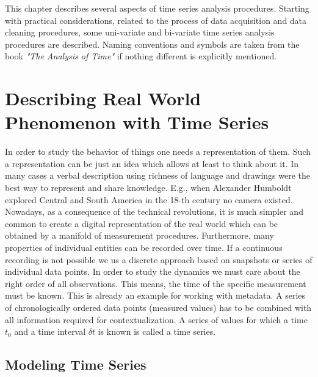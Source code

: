 \documentclass[a4paper,10pt]{scrbook}
\begin{document}
This chapter describes several aspects of time series analysis procedures. Starting with practical considerations, related to the process of data acquisition and data cleaning procedures, some uni-variate and bi-variate time series analysis procedures are described. Naming conventions and symbols are taken from the book \textit{"The Analysis of Time"} \cite{Chatfiled2004} if nothing different is explicitly mentioned.



\section{Describing Real World Phenomenon with Time Series}
In order to study the behavior of things one needs a representation of them. Such a representation can be just an idea which allows at least to think about it. In many cases a verbal description using richness of language and drawings were the best way to represent and share knowledge. E.g., when Alexander Humboldt explored Central and South America in the 18-th century no camera existed. Nowadays, as a consequence of the technical revolutions, it is much simpler and common to create a digital representation of the real world which can be obtained by a manifold of measurement procedures. Furthermore, many properties of individual entities can be recorded over time. If a continuous recording is not possible we us a discrete approach based on snapshots or series of individual data points. In order to study the dynamics we must care about the right order of all observations. This means, the time of the specific measurement must be known. This is already an example for working with metadata. A series of chronologically ordered data points (measured values) has to be combined with all information required for contextualization. A series of values for which a time $t_0$ and a time interval $\delta t$ is known is called a time series.

\subsection{Modeling Time Series}
\end{document}
